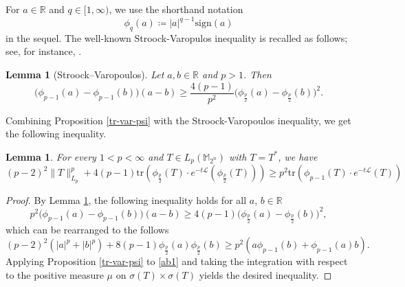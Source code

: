\documentclass{amsbook}
\newtheorem{lemma}[theorem]{Lemma}
\theoremstyle{definition}
\theoremstyle{remark}
\numberwithin{section}{chapter}
\numberwithin{equation}{chapter}
\newcommand{\1}{\mathbf{1}}
\begin{document}
For  $a\in \mathbb{R}$ and $q\in [1,\infty)$, we use the shorthand notation 
\begin{equation}\label{phiq}
\phi_{q}(a)\coloneqq |a|^{q-1}\mathrm{sign}(a)
\end{equation}
 in the sequel. The well-known Stroock-Varopulos inequality is recalled as follows; see, for instance, \cite[Lemma 2.4]{HMO2017}.

\begin{lemma}[Stroock--Varopoulos]\label{svi}
Let \(a, b \in \mathbb{R}\) and \(p > 1\). Then
\[ 
\bigl(\phi_{p-1}(a) - \phi_{p-1}(b)\bigr)(a - b) \geq \frac{4(p-1)}{p^2} \bigl(\phi_{\frac{p}{2}}(a) - \phi_{\frac{p}{2}}(b)\bigr)^2.
\]
\end{lemma}

Combining Proposition \ref{tr-var-psi} with the Stroock-Varopoulos inequality, we get the following inequality.
\begin{lemma}\label{p-var}
For every $1<p<\infty$ and $T\in L_{p}(\mathbb{M}_{2^{n}})$ with $T=T^{*}$, we have
\[
(p-2)^{2}\|T\|^{p}_{L_{p}}+4(p-1)\mathrm{tr}(\phi_{\frac{p}{2}}(T)\cdot e^{-t\mathcal L}(\phi_{\frac{p}{2}}(T)))\geq p^2\mathrm{tr}(\phi_{p-1}(T)\cdot e^{-t\mathcal L}(T))
\]
\end{lemma}
\begin{proof} 
By Lemma \ref{svi}, the following inequality holds for all $a$, $b\in \mathbb{R}$
\begin{equation*}
p^2\bigl(\phi_{p-1}(a) - \phi_{p-1}(b)\bigr)(a - b) \geq 4(p-1) \bigl(\phi_{\frac{p}{2}}(a) - \phi_{\frac{p}{2}}(b)\bigr)^{2},
\end{equation*}
which can be rearranged to the follows
\begin{equation}\label{ab1}
(p-2)^2(|a|^p+|b|^p)+8(p-1)\phi_{\frac p2}(a)\phi_{\frac p2}(b)\geq p^2(a\phi_{p-1}(b)+\phi_{p-1}(a)b).
\end{equation}
Applying Proposition \ref{tr-var-psi} to \eqref{ab1} and taking the integration with respect to the positive measure $\mu$ on $\sigma(T)\times \sigma(T)$ yields the desired inequality.
\end{proof}
\end{document}
